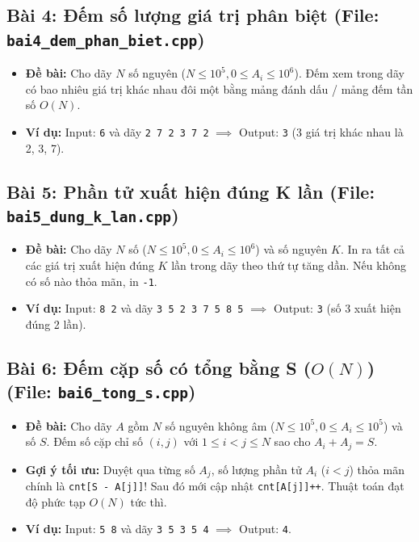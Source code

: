 \documentclass[11pt,a4paper]{article}
\begin{document}
\newpage
\subsection*{\color{AsianDarkBlue}\normalsize Bài 4: Đếm số lượng giá trị phân biệt (File: \texttt{bai4\_dem\_phan\_biet.cpp})}
\begin{itemize}
    \setlength{\itemsep}{1pt}
    \small
    \item \textbf{Đề bài:} Cho dãy $N$ số nguyên ($N \le 10^5, 0 \le A_i \le 10^6$). Đếm xem trong dãy có bao nhiêu giá trị khác nhau đôi một bằng mảng đánh dấu / mảng đếm tần số $O(N)$.
    \item \textbf{Ví dụ:} Input: \texttt{6} và dãy \texttt{2 7 2 3 7 2} $\implies$ Output: \texttt{3} (3 giá trị khác nhau là 2, 3, 7).
\end{itemize}

\subsection*{\color{AsianDarkBlue}\normalsize Bài 5: Phần tử xuất hiện đúng K lần (File: \texttt{bai5\_dung\_k\_lan.cpp})}
\begin{itemize}
    \setlength{\itemsep}{1pt}
    \small
    \item \textbf{Đề bài:} Cho dãy $N$ số ($N \le 10^5, 0 \le A_i \le 10^6$) và số nguyên $K$. In ra tất cả các giá trị xuất hiện đúng $K$ lần trong dãy theo thứ tự tăng dần. Nếu không có số nào thỏa mãn, in \texttt{-1}.
    \item \textbf{Ví dụ:} Input: \texttt{8 2} và dãy \texttt{3 5 2 3 7 5 8 5} $\implies$ Output: \texttt{3} (số 3 xuất hiện đúng 2 lần).
\end{itemize}

\subsection*{\color{AsianDarkBlue}\normalsize Bài 6: Đếm cặp số có tổng bằng S ($O(N)$) (File: \texttt{bai6\_tong\_s.cpp})}
\begin{itemize}
    \setlength{\itemsep}{1pt}
    \small
    \item \textbf{Đề bài:} Cho dãy $A$ gồm $N$ số nguyên không âm ($N \le 10^5, 0 \le A_i \le 10^5$) và số $S$. Đếm số cặp chỉ số $(i, j)$ với $1 \le i < j \le N$ sao cho $A_i + A_j = S$.
    \item \textbf{Gợi ý tối ưu:} Duyệt qua từng số $A_j$, số lượng phần tử $A_i$ ($i < j$) thỏa mãn chính là \texttt{cnt[S - A[j]]}! Sau đó mới cập nhật \texttt{cnt[A[j]]++}. Thuật toán đạt độ phức tạp $O(N)$ tức thì.
    \item \textbf{Ví dụ:} Input: \texttt{5 8} và dãy \texttt{3 5 3 5 4} $\implies$ Output: \texttt{4}.
\end{itemize}
\end{document}
